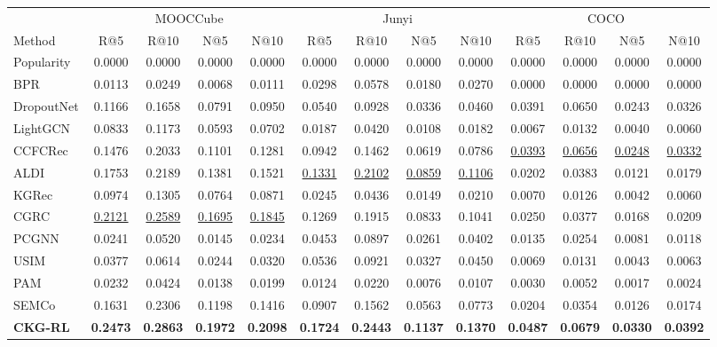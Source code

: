 \documentclass[letterpaper]{article}
\newcommand{\sigmark}[1]{\rlap{\textsuperscript{\scriptsize #1}}}
\begin{document}
\begin{table}[t]
\centering
{
\small
\setlength{\tabcolsep}{1.35pt}
\renewcommand{\arraystretch}{0.98}
\begin{tabular}{lcccccccccccc}
\toprule
& \multicolumn{4}{c}{MOOCCube} & \multicolumn{4}{c}{Junyi} & \multicolumn{4}{c}{COCO} \\
\cmidrule(lr){2-5}\cmidrule(lr){6-9}\cmidrule(lr){10-13}
Method & R@5 & R@10 & N@5 & N@10 & R@5 & R@10 & N@5 & N@10 & R@5 & R@10 & N@5 & N@10 \\
\midrule
Popularity & 0.0000 & 0.0000 & 0.0000 & 0.0000 & 0.0000 & 0.0000 & 0.0000 & 0.0000 & 0.0000 & 0.0000 & 0.0000 & 0.0000 \\
BPR & 0.0113 & 0.0249 & 0.0068 & 0.0111 & 0.0298 & 0.0578 & 0.0180 & 0.0270 & 0.0000 & 0.0000 & 0.0000 & 0.0000 \\
DropoutNet & 0.1166 & 0.1658 & 0.0791 & 0.0950 & 0.0540 & 0.0928 & 0.0336 & 0.0460 & 0.0391 & 0.0650 & 0.0243 & 0.0326 \\
LightGCN & 0.0833 & 0.1173 & 0.0593 & 0.0702 & 0.0187 & 0.0420 & 0.0108 & 0.0182 & 0.0067 & 0.0132 & 0.0040 & 0.0060 \\
CCFCRec & 0.1476 & 0.2033 & 0.1101 & 0.1281 & 0.0942 & 0.1462 & 0.0619 & 0.0786 & \underline{0.0393} & \underline{0.0656} & \underline{0.0248} & \underline{0.0332} \\
ALDI & 0.1753 & 0.2189 & 0.1381 & 0.1521 & \underline{0.1331} & \underline{0.2102} & \underline{0.0859} & \underline{0.1106} & 0.0202 & 0.0383 & 0.0121 & 0.0179 \\
KGRec & 0.0974 & 0.1305 & 0.0764 & 0.0871 & 0.0245 & 0.0436 & 0.0149 & 0.0210 & 0.0070 & 0.0126 & 0.0042 & 0.0060 \\
CGRC & \underline{0.2121} & \underline{0.2589} & \underline{0.1695} & \underline{0.1845} & 0.1269 & 0.1915 & 0.0833 & 0.1041 & 0.0250 & 0.0377 & 0.0168 & 0.0209 \\
PCGNN & 0.0241 & 0.0520 & 0.0145 & 0.0234 & 0.0453 & 0.0897 & 0.0261 & 0.0402 & 0.0135 & 0.0254 & 0.0081 & 0.0118 \\
USIM & 0.0377 & 0.0614 & 0.0244 & 0.0320 & 0.0536 & 0.0921 & 0.0327 & 0.0450 & 0.0069 & 0.0131 & 0.0043 & 0.0063 \\
PAM & 0.0232 & 0.0424 & 0.0138 & 0.0199 & 0.0124 & 0.0220 & 0.0076 & 0.0107 & 0.0030 & 0.0052 & 0.0017 & 0.0024 \\
SEMCo & 0.1631 & 0.2306 & 0.1198 & 0.1416 & 0.0907 & 0.1562 & 0.0563 & 0.0773 & 0.0204 & 0.0354 & 0.0126 & 0.0174 \\
\midrule
\textbf{CKG-RL} & \textbf{0.2473}\sigmark{*} & \textbf{0.2863}\sigmark{*} & \textbf{0.1972}\sigmark{*} & \textbf{0.2098}\sigmark{*} & \textbf{0.1724}\sigmark{*} & \textbf{0.2443}\sigmark{*} & \textbf{0.1137}\sigmark{*} & \textbf{0.1370}\sigmark{*} & \textbf{0.0487}\sigmark{*} & \textbf{0.0679} & \textbf{0.0330}\sigmark{*} & \textbf{0.0392}\sigmark{*} \\

\end{tabular}}
\end{table}
\end{document}
